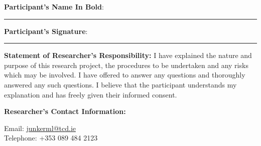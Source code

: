 \vspace{1cm}
\textbf{Participant's Name In Bold}: \rule{6cm}{1pt}

\vspace{1cm}
\textbf{Participant's Signature}: \rule{6.75cm}{1pt}

\vspace{1cm}
\textbf{Statement of Researcher's Responsibility:} I have explained the nature and purpose of this research project, the procedures to be undertaken and any risks which may be involved. I have offered to answer any questions and thoroughly answered any such questions. I believe that the participant understands my explanation and has freely given their informed consent.


\textbf{Researcher's Contact Information:}

Email: \href{mailto:junkerml@tcd.ie}{junkerml@tcd.ie}\\
Telephone: +353 089 484 2123